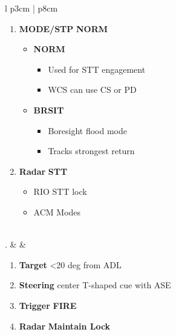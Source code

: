 \documentclass[8pt,usenames,dvipsnames,twoside]{article}
\begin{document}
\begin{center}
\begin{tabular}{l p{3cm} | p{8cm}}
\begin{minipage}[t]{\linewidth}
					\vspace{-7pt}
					\begin{enumerate}[label=(\alph*)]
						\item \textbf{MODE/STP} \dotfill \textbf{NORM}
						\begin{itemize}
							\item \textbf{NORM}
							\begin{itemize}
								\item Used for STT engagement
								\item WCS can use CS or PD
							\end{itemize}
							\item \textbf{BRSIT}
							\begin{itemize}
								\item Boresight flood mode
								\item Tracks strongest return
							\end{itemize}
						\end{itemize}
						\item \textbf{Radar} \dotfill \textbf{STT}
						\begin{itemize}
							\item RIO STT lock
							\item ACM Modes
						\end{itemize}
					\end{enumerate}
				\end{minipage} \\
				. &  & 
				\begin{minipage}[t]{\linewidth}
					\vspace{-7pt}
					\begin{enumerate}[label=(\alph*)]
						\item \textbf{Target} \dotfill <20 deg from ADL
						\item \textbf{Steering} \dotfill center T-shaped cue with ASE
						\item \textbf{Trigger} \dotfill \textbf{FIRE}
						\item \textbf{Radar} \dotfill \textbf{Maintain Lock}
					\end{enumerate}
				\end{minipage} \\
				\bottomrule
			\end{tabular}
		\end{center}
		
\end{document}
